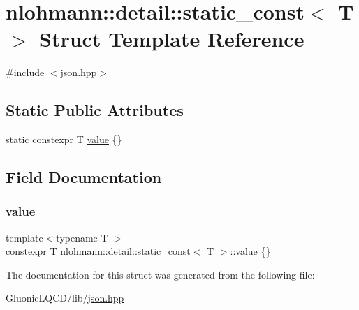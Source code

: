 \hypertarget{structnlohmann_1_1detail_1_1static__const}{}\section{nlohmann\+::detail\+::static\+\_\+const$<$ T $>$ Struct Template Reference}
\label{structnlohmann_1_1detail_1_1static__const}


{\ttfamily \#include $<$json.\+hpp$>$}

\subsection*{Static Public Attributes}
\begin{DoxyCompactItemize}
\item 
static constexpr T \mbox{\hyperlink{structnlohmann_1_1detail_1_1static__const_a6bb7ab2ddd6abc41fb4ffb7c6dfa237e}{value}} \{\}
\end{DoxyCompactItemize}


\subsection{Field Documentation}
\mbox{\label{structnlohmann_1_1detail_1_1static__const_a6bb7ab2ddd6abc41fb4ffb7c6dfa237e}} 
\subsubsection{\texorpdfstring{value}{value}}
{\footnotesize\ttfamily template$<$typename T $>$ \\
constexpr T \mbox{\hyperlink{structnlohmann_1_1detail_1_1static__const}{nlohmann\+::detail\+::static\+\_\+const}}$<$ T $>$\+::value \{\}\hspace{0.3cm}{\ttfamily [static]}}



The documentation for this struct was generated from the following file\+:\begin{DoxyCompactItemize}
\item 
Gluonic\+L\+Q\+C\+D/lib/\mbox{\hyperlink{json_8hpp}{json.\+hpp}}\end{DoxyCompactItemize}
